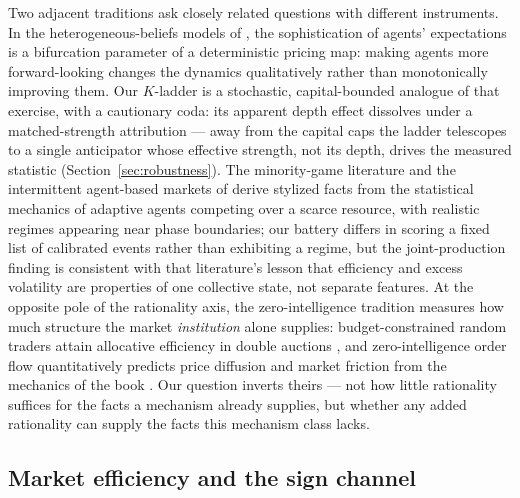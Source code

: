 \documentclass[11pt]{article}
\begin{document}
Two adjacent traditions ask closely related questions with different
instruments. In the heterogeneous-beliefs models of
\citet{brock1997, brock1998},
the sophistication of agents' expectations is a bifurcation parameter of a
deterministic pricing map: making agents more forward-looking changes the
dynamics qualitatively rather than monotonically improving them. Our
$K$-ladder is a stochastic, capital-bounded analogue of that exercise,
with a cautionary coda: its apparent depth effect dissolves under a
matched-strength attribution --- away from the capital caps the ladder
telescopes to a single anticipator whose effective strength, not its
depth, drives the measured statistic (Section~\ref{sec:robustness}). The
minority-game literature
\citep{challet1997, challet2004} and the intermittent agent-based markets of
\citet{giardina2003} derive stylized facts from the statistical mechanics of
adaptive agents competing over a scarce resource, with realistic regimes
appearing near phase boundaries; our battery differs in scoring a fixed list
of calibrated events rather than exhibiting a regime, but the joint-production
finding is consistent with that literature's lesson that efficiency and excess
volatility are properties of one collective state, not separate features.
At the opposite pole of the rationality axis, the zero-intelligence
tradition measures how much structure the market \emph{institution} alone
supplies: budget-constrained random traders attain allocative efficiency
in double auctions \citep{gode1993}, and zero-intelligence order flow
quantitatively predicts price diffusion and market friction from the
mechanics of the book \citep{daniels2003, farmer2005zi}. Our question
inverts theirs --- not how little rationality suffices for the facts a
mechanism already supplies, but whether any added rationality can supply
the facts this mechanism class lacks.

\subsection{Market efficiency and the sign channel}
\label{sec:related:eff}
\end{document}
